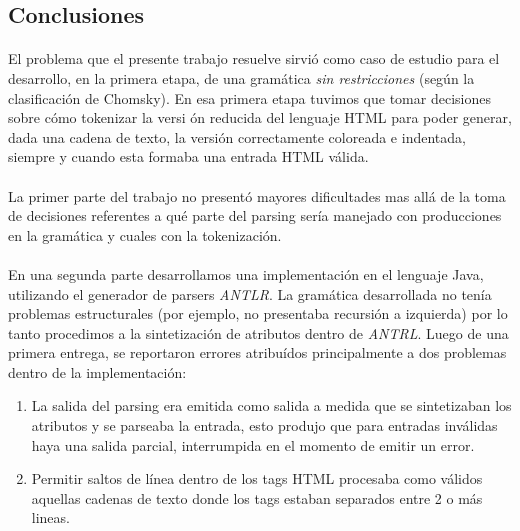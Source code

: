 \subsection{Conclusiones}
\paragraph{}El problema que el presente trabajo resuelve sirvi\'o como caso de estudio para el desarrollo, en la primera etapa, de una gram\'atica \emph{sin restricciones} (seg\'un la clasificaci\'on de Chomsky). En esa primera etapa tuvimos que tomar decisiones sobre c\'omo tokenizar la versi
\'on reducida del lenguaje HTML para poder generar, dada una cadena de texto, la versi\'on correctamente coloreada e indentada, siempre y cuando esta formaba una entrada HTML v\'alida.

\paragraph{}La primer parte del trabajo no present\'o mayores dificultades mas all\'a de la toma de decisiones referentes a qu\'e parte del parsing ser\'ia manejado con producciones en la gram\'atica y cuales con la tokenizaci\'on. 

\paragraph{}En una segunda parte desarrollamos una implementaci\'on en el lenguaje Java, utilizando el generador de parsers \emph{ANTLR}. La gram\'atica desarrollada no ten\'ia problemas estructurales (por ejemplo, no presentaba recursi\'on a izquierda) por lo tanto procedimos a la sintetizaci\'on de atributos dentro de \emph{ANTRL}. Luego de una primera entrega, se reportaron errores atribu\'idos principalmente a dos problemas dentro de la implementaci\'on:

\begin{enumerate}
    \item La salida del parsing era emitida como salida a medida que se sintetizaban los atributos y se parseaba la entrada, esto produjo que para entradas inv\'alidas haya una salida parcial, interrumpida en el momento de emitir un error. 
    \item Permitir saltos de l\'inea dentro de los tags HTML procesaba como v\'alidos aquellas cadenas de texto donde los tags estaban separados entre 2 o m\'as lineas. 
\end{enumerate}

